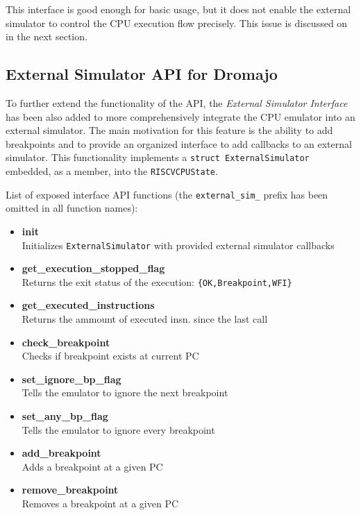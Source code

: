 \noindent
This interface is good enough for basic usage, but it does not enable the external simulator to control the CPU
execution flow precisely. This issue is discussed on in the next section.

\pagebreak

\subsection{External Simulator API for Dromajo}

To further extend the functionality of the API, the \textit{External Simulator Interface} has been also added
to more comprehensively integrate the CPU emulator into an external simulator. The main motivation for this
feature is the ability to add breakpoints and to provide an organized interface to add callbacks to an external
simulator. This functionality implements a \texttt{struct ExternalSimulator} embedded, as a member, into the
\texttt{RISCVCPUState}.

\vspace{10px}
\noindent
List of exposed interface API functions (the \texttt{external\_sim\_} prefix has been omitted in all function names):
\begin{multicols}{2}
    \begin{itemize}
        \item{\textbf{init}\\Initializes \texttt{ExternalSimulator} with provided external simulator callbacks}
        \item{\textbf{get\_execution\_stopped\_flag}\\Returns the exit status of the execution:
        \texttt{\{OK,Breakpoint,WFI\}}}
        \item{\textbf{get\_executed\_instructions}\\Returns the ammount of executed insn. since the last call}
        \item{\textbf{check\_breakpoint}\\Checks if breakpoint exists at current PC}
        \item{\textbf{set\_ignore\_bp\_flag}\\Tells the emulator to ignore the next breakpoint}
        \item{\textbf{set\_any\_bp\_flag}\\Tells the emulator to ignore every breakpoint}
        \item{\textbf{add\_breakpoint}\\Adds a breakpoint at a given PC}
        \item{\textbf{remove\_breakpoint}\\Removes a breakpoint at a given PC}
    \end{itemize}
\end{multicols}

